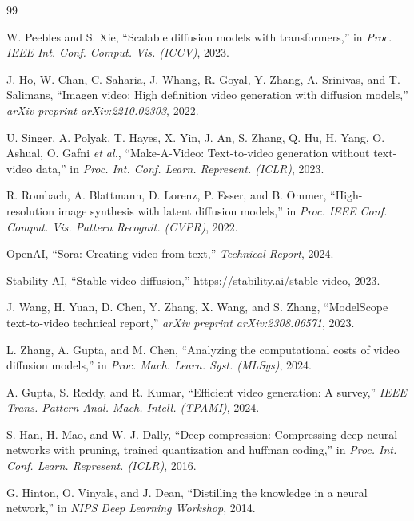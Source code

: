 \documentclass[journal]{IEEEtran}
\theoremstyle{definition}
\theoremstyle{remark}
\begin{document}
\begin{thebibliography}{99}

W. Peebles and S. Xie, ``Scalable diffusion models with transformers,'' in \textit{Proc. IEEE Int. Conf. Comput. Vis. (ICCV)}, 2023.

J. Ho, W. Chan, C. Saharia, J. Whang, R. Goyal, Y. Zhang, A. Srinivas, and T. Salimans, ``Imagen video: High definition video generation with diffusion models,'' \textit{arXiv preprint arXiv:2210.02303}, 2022.

U. Singer, A. Polyak, T. Hayes, X. Yin, J. An, S. Zhang, Q. Hu, H. Yang, O. Ashual, O. Gafni \textit{et al.}, ``Make-A-Video: Text-to-video generation without text-video data,'' in \textit{Proc. Int. Conf. Learn. Represent. (ICLR)}, 2023.

R. Rombach, A. Blattmann, D. Lorenz, P. Esser, and B. Ommer, ``High-resolution image synthesis with latent diffusion models,'' in \textit{Proc. IEEE Conf. Comput. Vis. Pattern Recognit. (CVPR)}, 2022.

OpenAI, ``Sora: Creating video from text,'' \textit{Technical Report}, 2024.

Stability AI, ``Stable video diffusion,'' \url{https://stability.ai/stable-video}, 2023.

J. Wang, H. Yuan, D. Chen, Y. Zhang, X. Wang, and S. Zhang, ``ModelScope text-to-video technical report,'' \textit{arXiv preprint arXiv:2308.06571}, 2023.

L. Zhang, A. Gupta, and M. Chen, ``Analyzing the computational costs of video diffusion models,'' in \textit{Proc. Mach. Learn. Syst. (MLSys)}, 2024.

A. Gupta, S. Reddy, and R. Kumar, ``Efficient video generation: A survey,'' \textit{IEEE Trans. Pattern Anal. Mach. Intell. (TPAMI)}, 2024.

S. Han, H. Mao, and W. J. Dally, ``Deep compression: Compressing deep neural networks with pruning, trained quantization and huffman coding,'' in \textit{Proc. Int. Conf. Learn. Represent. (ICLR)}, 2016.

G. Hinton, O. Vinyals, and J. Dean, ``Distilling the knowledge in a neural network,'' in \textit{NIPS Deep Learning Workshop}, 2014.


\end{thebibliography}
\end{document}
